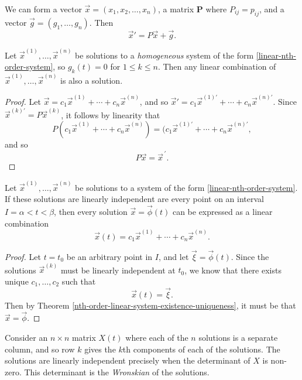 \begin{rmk}
    We can form a vector $\vec{x} = (x_1, x_2, \ldots, x_n)$, a matrix $\bm{P}$ where $P_{ij} = p_{ij}$, and a vector $\vec{g} = (g_1, \ldots, g_n)$. Then
    \[\vec{x}' = P\vec{x} + \vec{g}.\]
\end{rmk}

\begin{prop}
    Let $\vec{x}^{(1)}, \ldots, \vec{x}^{(n)}$ be solutions to a \emph{homogeneous} system of the form \ref{linear-nth-order-system}, so $g_k(t) = 0$ for $1 \leq k \leq n$. Then any linear combination of $\vec{x}^{(1)}, \ldots, \vec{x}^{(n)}$ is also a solution.
\end{prop}

\begin{proof}
    Let $\vec{x} = c_1\vec{x}^{(1)} + \cdots + c_n\vec{x}^{(n)}$, and so $\vec{x}' = c_1\vec{x}^{(1)\prime} + \cdots + c_n\vec{x}^{(n)\prime}$.
    Since $\vec{x}^{(k)\prime} = P\vec{x}^{(k)}$, it follows by linearity that
    \[P(c_1\vec{x}^{(1)} + \cdots + c_n\vec{x}^{(n)}) = (c_1\vec{x}^{(1)\prime} + \cdots + c_n\vec{x}^{(n)\prime},\]
    and so
    \[P\vec{x} = \vec{x}^{\,\prime}.\]
\end{proof}

\begin{thm}\label{linear-system-fundamental-solution}
    Let $\vec{x}^{(1)}, \ldots, \vec{x}^{(n)}$ be solutions to a system of the form \ref{linear-nth-order-system}. If these solutions are linearly independent are every point on an interval $I = \alpha < t < \beta$, then every solution $\vec{x} = \vec{\phi}(t)$ can be expressed as a linear combination
    \[\vec{x}(t) = c_1\vec{x}^{(1)} + \cdots + c_n\vec{x}^{(n)}.\]
\end{thm}

\begin{proof}
    Let $t = t_0$ be an arbitrary point in $I$, and let $\vec{\xi} = \vec{\phi}(t)$. Since the solutions $\vec{x}^{(k)}$ must be linearly independent at $t_0$, we know that there exists unique $c_1, \ldots, c_2$ such that
    \[\vec{x}(t) = \vec{\xi}.\]
    Then by Theorem \ref{nth-order-linear-system-existence-uniqueness}, it must be that $\vec{x} = \vec{\phi}$.
\end{proof}

\begin{rmk}
    Consider an $n \times n$ matrix $X(t)$ where each of the $n$ solutions is a separate column, and so row $k$ gives the $k$th components of each of the solutions. The solutions are linearly independent precisely when the determinant of $X$ is non-zero. This determinant is the \emph{Wronskian} of the solutions.
\end{rmk}

